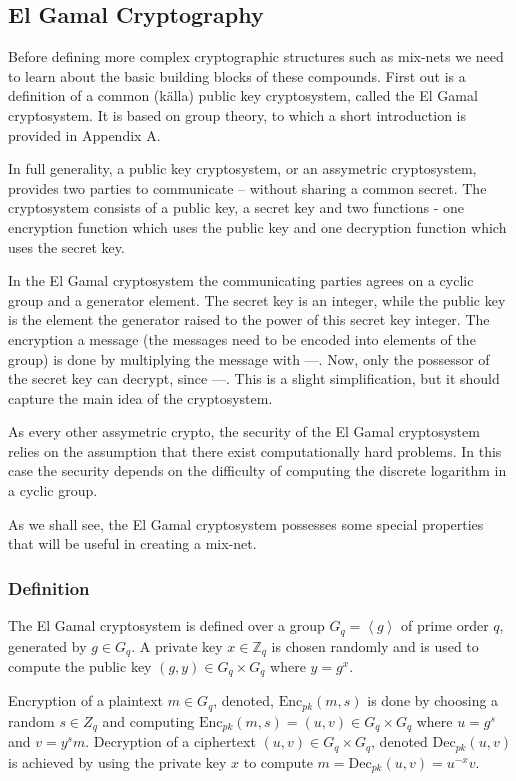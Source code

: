 \subsection{El Gamal Cryptography}

Before defining more complex cryptographic structures such as mix-nets
we need to learn about the basic building blocks of these
compounds. First out is a definition of a common (källa) public key
cryptosystem, called the El Gamal cryptosystem. It is based on group
theory, to which a short introduction is provided in Appendix A. 

In full generality, a public key cryptosystem, or an assymetric
cryptosystem, provides two parties to communicate -- without sharing a
common secret. The cryptosystem consists of a public key, a secret key
and two functions - one encryption function which uses the public key
and one decryption function which uses the secret key.

In the El Gamal cryptosystem the communicating parties agrees on a
cyclic group and a generator element. The secret key is an integer,
while the public key is the element the generator raised to the power
of this secret key integer. The encryption a message (the messages
need to be encoded into elements of the group) is done by multiplying
the message with ---. Now, only the possessor of the secret key can
decrypt, since ---. This is a slight simplification, but it should
capture the main idea of the cryptosystem.

As every other assymetric crypto, the security of the El Gamal
cryptosystem relies on the assumption that there exist computationally
hard problems. In this case the security depends on the difficulty of
computing the discrete logarithm in a cyclic group.

As we shall see, the El Gamal cryptosystem possesses some special
properties that will be useful in creating a mix-net.

\subsubsection{Definition}
The El Gamal cryptosystem is defined over a group $G_q =
\left<g\right>$ of prime order $q$, generated by $g \in G_q$. A
private key $x \in \mathbb{Z}_q$ is chosen randomly and is used to
compute the public key $(g,y) \in G_q \times G_q$ where $y =
g^x$. 

Encryption of a plaintext $m \in G_q$, denoted,
$\mathrm{Enc}_{pk}(m,s)$ is done by choosing a random $s \in Z_q$ and
computing $ \mathrm{Enc}_{pk}(m,s) = (u,v) \in G_q \times G_q$ where
$u = g^s$ and $v = y^sm$. Decryption of a ciphertext $(u,v) \in G_q
\times G_q$, denoted $\mathrm{Dec}_{pk}(u,v)$ is achieved by using the
private key $x$ to compute $m = \mathrm{Dec}_{pk}(u,v) = u^{-x}v$.

